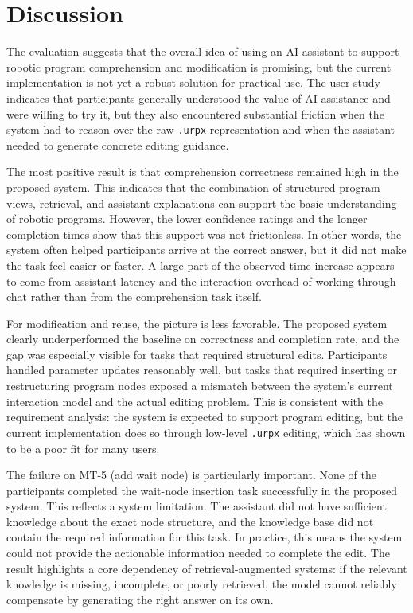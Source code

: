 \chapter{Discussion}
The evaluation suggests that the overall idea of using an AI assistant to support robotic program comprehension and modification is promising, but the current implementation is not yet a robust solution for practical use. The user study indicates that participants generally understood the value of AI assistance and were willing to try it, but they also encountered substantial friction when the system had to reason over the raw \texttt{.urpx} representation and when the assistant needed to generate concrete editing guidance.

The most positive result is that comprehension correctness remained high in the proposed system. This indicates that the combination of structured program views, retrieval, and assistant explanations can support the basic understanding of robotic programs. However, the lower confidence ratings and the longer completion times show that this support was not frictionless. In other words, the system often helped participants arrive at the correct answer, but it did not make the task feel easier or faster. A large part of the observed time increase appears to come from assistant latency and the interaction overhead of working through chat rather than from the comprehension task itself.

For modification and reuse, the picture is less favorable. The proposed system clearly underperformed the baseline on correctness and completion rate, and the gap was especially visible for tasks that required structural edits. Participants handled parameter updates reasonably well, but tasks that required inserting or restructuring program nodes exposed a mismatch between the system's current interaction model and the actual editing problem. This is consistent with the requirement analysis: the system is expected to support program editing, but the current implementation does so through low-level \texttt{.urpx} editing, which has shown to be a poor fit for many users.

The failure on MT-5 (add wait node) is particularly important. None of the participants completed the wait-node insertion task successfully in the proposed system. This reflects a system limitation. The assistant did not have sufficient knowledge about the exact node structure, and the knowledge base did not contain the required information for this task. In practice, this means the system could not provide the actionable information needed to complete the edit. The result highlights a core dependency of retrieval-augmented systems: if the relevant knowledge is missing, incomplete, or poorly retrieved, the model cannot reliably compensate by generating the right answer on its own.

